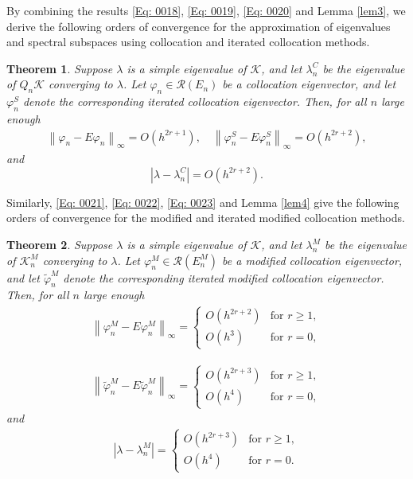 \documentclass[pdflatex, sn-mathphys-num]{sn-jnl}%
\newcommand{\norm}[1]{\left\lVert #1\right\rVert}
\theoremstyle{thmstyleone}%
\newtheorem{theorem}{Theorem}[section]
\theoremstyle{thmstyletwo}%
\theoremstyle{thmstylethree}%
\begin{document}
By combining the results \eqref{Eq: 0018}, \eqref{Eq: 0019}, \eqref{Eq: 0020} and Lemma \ref{lem3}, we derive the following orders of convergence for the approximation of eigenvalues and spectral subspaces using collocation and iterated collocation methods.
\begin{theorem} \label{tc1}
	Suppose $\lambda$ is a simple eigenvalue of $\mathcal{K}$, 
	and let $\lambda_n^C$ be the eigenvalue of $Q_n  \mathcal{K} $ converging to $\lambda$.  
	Let $\varphi_n \in \mathcal{R}(E_n)$ be a collocation eigenvector, and let $\varphi_n^S$ denote the corresponding iterated collocation eigenvector. Then, for all $n$ large enough
	\begin{eqnarray*} 
		\norm{\varphi_n - E\varphi_n  }_{\infty} = O\left(h^{2r +1}\right), \quad 	\norm{\varphi_n^S - E\varphi_n^S  }_{\infty} = O\left(h^{2r +2}\right),
	\end{eqnarray*}
	and 
	\begin{equation*} 
		\left| \lambda - \lambda_n^C \right| = O\left(h^{2r +2}\right).
	\end{equation*}
\end{theorem}	

Similarly, \eqref{Eq: 0021}, \eqref{Eq: 0022}, \eqref{Eq: 0023} and Lemma \ref{lem4} give the following orders of convergence for the modified and iterated modified collocation methods.
\begin{theorem} \label{tc2}
	Suppose $\lambda$ is a simple eigenvalue of $\mathcal{K}$, 
	and let $\lambda_n^M$ be the eigenvalue of $\mathcal{K}_n^M$ converging to $\lambda$.  
	Let $\varphi_n^M \in \mathcal{R}(E_n^M)$ be a modified collocation eigenvector, and let $\widetilde{\varphi}_n^M$ denote the corresponding iterated modified collocation eigenvector. Then, for all $n$ large enough
	\begin{eqnarray*} 
		\norm{\varphi_n^M - E\varphi_n^M  }_{\infty} =
		\begin{cases}
			O\left(h^{2r+2} \right) & \text{for } r \geq 1, \\
			O\left(h^{3} \right) & \text{for } r = 0,
		\end{cases}
	\end{eqnarray*}
	
	\begin{eqnarray*} 
		\norm{\widetilde{\varphi}_n^M - E\widetilde{\varphi}_n^M  }_{\infty} = 
		\begin{cases}
			O\left(h^{2r+3} \right) & \text{for } r \geq 1, \\
			O\left( h^{4} \right) & \text{for } r = 0,
		\end{cases}
	\end{eqnarray*}
	and 
	\begin{eqnarray*} 
		| \lambda -  \lambda_n^M | = 
		\begin{cases}
			O\left(h^{2r+3} \right) & \text{for } r \geq 1, \\
			O\left( h^{4} \right) & \text{for } r = 0.
		\end{cases}
	\end{eqnarray*}
\end{theorem}	
\end{document}
